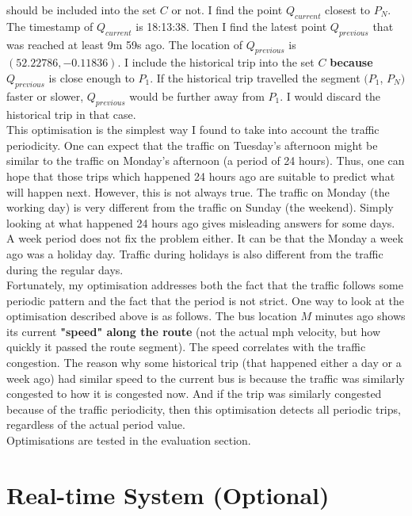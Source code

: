 \documentclass[12pt,a4paper,oneside,openright]{report}
\begin{document}
should be included into the set $C$ or not. I find the point $Q_{current}$ closest to
$P_N$. The timestamp of $Q_{current}$ is 18:13:38. Then I find the latest point $Q_{previous}$
that was reached at least 9m 59s ago. The location of $Q_{previous}$ is $(52.22786, -0.11836)$.
I include the historical trip into the set $C$ \textbf{because} $Q_{previous}$ is close enough
to $P_1$. If the historical trip travelled the segment $(P_1$, $P_N)$ faster or slower,
$Q_{previous}$ would be further away from $P_1$. I would discard the historical trip in that case. \\

This optimisation is the simplest way I found to take into account the traffic
periodicity. One can expect that the traffic on Tuesday's afternoon might be similar to the
traffic on Monday's afternoon (a period of 24 hours). Thus, one can hope that those trips which
happened 24 hours ago are suitable to predict what will happen next. However,
this is not always true. The traffic on Monday (the working day) is very different
from the traffic on Sunday (the weekend). Simply looking at what happened 24 hours ago gives
misleading answers for some days. A week period does not fix the problem either.
It can be that the Monday a week ago was a holiday day.
Traffic during holidays is also different from the traffic during the regular days. \\

Fortunately, my optimisation addresses both the fact that the traffic follows some
periodic pattern and the fact that the period is not strict. One way to look at
the optimisation described above is as follows. The bus location $M$ minutes ago shows
its current \textbf{"speed" along the route} (not the actual mph velocity, but how
quickly it passed the route segment). The speed correlates with the traffic
congestion. The reason why some historical trip (that happened either a day or a week
ago) had similar speed to the current bus is because the traffic was similarly
congested to how it is congested now. And if the trip was similarly congested because
of the traffic periodicity, then this optimisation detects all periodic trips, regardless
of the actual period value. \\

Optimisations are tested in the evaluation section.


\newpage

\section{Real-time System (Optional)}
\end{document}
